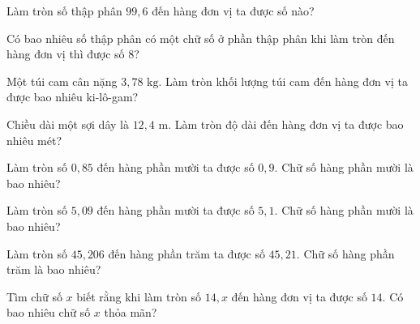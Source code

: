 \begin{ex}
  Làm tròn số thập phân $99{,}6$ đến hàng đơn vị ta được số nào?
\end{ex}

\begin{ex}
  Có bao nhiêu số thập phân có một chữ số ở phần thập phân khi làm tròn đến hàng đơn vị thì được số $8$?
\end{ex}

\begin{ex}
  Một túi cam cân nặng $3{,}78\text{ kg}$. Làm tròn khối lượng túi cam đến hàng đơn vị ta được bao nhiêu ki-lô-gam?
\end{ex}

\begin{ex}
  Chiều dài một sợi dây là $12{,}4\text{ m}$. Làm tròn độ dài đến hàng đơn vị ta được bao nhiêu mét?
\end{ex}

\begin{ex}
  Làm tròn số $0{,}85$ đến hàng phần mười ta được số $0{,}9$. Chữ số hàng phần mười là bao nhiêu?
\end{ex}

\begin{ex}
  Làm tròn số $5{,}09$ đến hàng phần mười ta được số $5{,}1$. Chữ số hàng phần mười là bao nhiêu?
\end{ex}

\begin{ex}
  Làm tròn số $45{,}206$ đến hàng phần trăm ta được số $45{,}21$. Chữ số hàng phần trăm là bao nhiêu?
\end{ex}

\begin{ex}
  Tìm chữ số $x$ biết rằng khi làm tròn số $14{,}x$ đến hàng đơn vị ta được số $14$. Có bao nhiêu chữ số $x$ thỏa mãn?
\end{ex}

